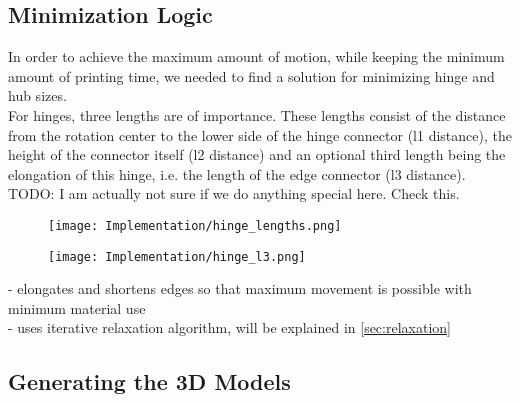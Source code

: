 \subsection{Minimization Logic}
In order to achieve the maximum amount of motion, while keeping the minimum amount of printing time, we needed to find a solution for minimizing hinge and hub sizes.\\
For hinges, three lengths are of importance. These lengths consist of the distance from the rotation center to the lower side of the hinge connector (l1 distance), the height of the connector itself (l2 distance) and an optional third length being the elongation of this hinge, i.e. the length of the edge connector (l3 distance).
TODO: I am actually not sure if we do anything special here. Check this.
\begin{figure}[ht]
  \centering
  \begin{minipage}[t]{5cm}
    \centering
    \texttt{[image: Implementation/hinge\_lengths.png]}
    \label{fig:leg_asset}
  \end{minipage}%
  \vspace{3cm}
  \begin{minipage}[t]{5cm}
    \centering
    \texttt{[image: Implementation/hinge\_l3.png]}
    \label{fig:spider_in_progress}
  \end{minipage}
\end{figure}
- elongates and shortens edges so that maximum movement is possible with minimum material use\\
- uses iterative relaxation algorithm, will be explained in \ref{sec:relaxation}

\subsection{Generating the 3D Models}\label{sec:openscad_impl}
